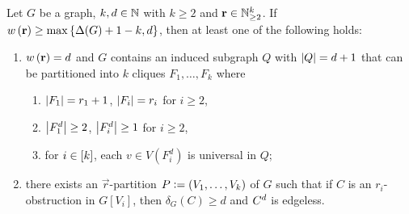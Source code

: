       \begin{thm}\label{PartitionTheorem}
			Let $G$ be a graph, $k,d \in \mathbb{N}$ with $k \geq 2$ and $\mathbf{r} \in \mathbb{N}_{\geq 2}^k$.  If $w\left( \mathbf{r} \right) \geq \max\left\{ \Delta(G) + 1 - k, d \right\}$, then at least one of the following holds:
			\begin{enumerate}
			  \item $w\left( \mathbf{r} \right) = d$ and $G$ contains an induced subgraph $Q$ with $\left|Q\right| = d+1$ that can be partitioned into $k$ cliques $F_1, \ldots, F_k$ where 
					\begin{enumerate}
					\item $\left|F_1\right| = r_1 + 1$, $\left|F_i\right| = r_i$ for $i \geq 2$,
					\item $\left|F_1^d\right| \geq 2$, $\left|F_i^d\right| \geq 1$ for $i \geq 2$,
					\item for $i \in \left[k\right]$, each $v \in V(F_i^d)$ is universal in $Q$;
					\end{enumerate}
			  \item there exists an $\vec{r}$-partition $P \mathrel{\mathop:}= \left( V_1, \ldots, V_k \right)$ of 	
$G$ such that if $C$ is an $r_i$-obstruction in $G[V_i]$, then $\delta_G(C) \geq d$ and
			  $C^{d}$ is edgeless.
			\end{enumerate}
		\end{thm}
